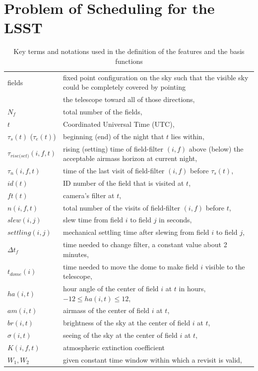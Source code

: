 \documentclass[12pt]{aastex62}
\theoremstyle{definition}
\begin{document}
\section{Problem of Scheduling for the LSST}\label{sec_lsst_problem}
%
\begin{table}[h]
\caption{Key terms and notations used in the definition of the features and the basis functions} \label{tab_notatopn}
\begin{tabular}{l  l }
\hline
fields & fixed point configuration on the sky such that the visible sky could be completely covered by pointing\\
& the telescope toward all of those directions, \\
$N_{f}$ & total number of the fields,\\
$t$& Coordinated Universal Time (UTC),\\ 
$\tau_s(t)$ ($\tau_e(t)$)& beginning (end) of the night that $t$ lies within,\\
$\tau_{rise\text{(}set\text{)}}(i,f,t)$ & rising (setting) time of field-filter $(i,f)$ above (below) the acceptable airmass horizon at current night,\\
$\tau_n(i,f,t)$& time of the last visit of field-filter $(i,f)$ before $\tau_s(t)$,\\
$id(t)$ & ID number of the field that is visited at $t$,\\
$ft(t)$& camera's filter at $t$,\\
$n(i,f,t)$ & total number of the visits of field-filter $(i,f)$ before $t$,\\
$slew(i,j)$& slew time from field $i$ to field $j$ in seconds,\\
$settling(i,j)$& mechanical settling time after slewing from field $i$ to field $j$,\\
$\Delta t_{f}$& time needed to change filter, a constant value about 2 minutes,\\
$t_{dome}(i)$& time needed to move the dome to make field $i$ visible to the telescope,\\
$ha(i,t)$ & hour angle of the center of field $i$ at $t$ in hours, $-12 \leq ha(i,t) \leq 12$,\\
$am(i,t)$ & airmass of the center of field $i$ at $t$,\\
$br(i,t)$ & brightness of the sky at the center of field $i$ at $t$,\\
$\sigma(i,t)$ & seeing of the sky at the center of field $i$ at $t$,\\
$K(i,f, t)$ & atmospheric extinction coefficient\\
$W_1, W_2$ & given constant time window within which a revisit is valid, \\
\hline
\end{tabular}
\end{table}
\end{document}
